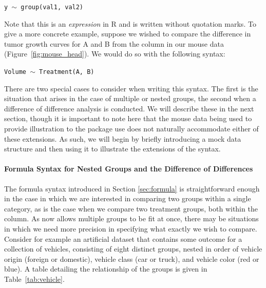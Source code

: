 \begin{center}
\tt y $\sim$ group(val1, val2)
\end{center}

Note that this is an \textit{expression} in R and is written without quotation marks. To give a more concrete example, suppose we wished to compare the difference in tumor growth curves for A and B from the  column in our mouse data (Figure~\ref{fig:mouse_head}). We would do so with the following syntax:


\begin{center}
\tt Volume $\sim$ Treatment(A, B)
\end{center}


There are two special cases to consider when writing this syntax. The first is the situation that arises in the case of multiple or nested groups, the second when a difference of difference analysis is conducted. We will describe these in the next section, though it is important to note here that the mouse data being used to provide illustration to the package use does not naturally accommodate either of these extensions. As such, we will begin by briefly introducing a mock data structure and then using it to illustrate the extensions of the syntax.


\paragraph{Formula Syntax for Nested Groups and the Difference of Differences} 

The formula syntax introduced in Section \ref{sec:formula} is straightforward enough in the case in which we are interested in comparing two groups within a single category, as is the case when we compare two treatment groups, both within the  column. As  now allows multiple groups to be fit at once, there may be situations in which we need more precision in specifying what exactly we wish to compare. Consider for example an artificial dataset that contains some outcome  for a collection of vehicles, consisting of eight distinct groups, nested in order of vehicle origin (foreign or domestic), vehicle class (car or truck), and vehicle color (red or blue). A table detailing the relationship of the groups is given in Table~\ref{tab:vehicle}.

